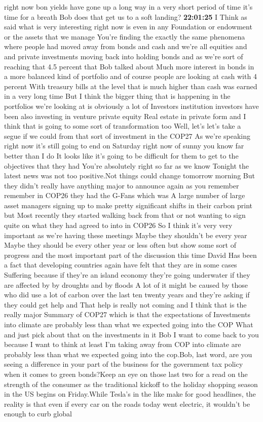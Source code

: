 \documentclass{article}%
\begin{document}
right now bon yields have gone up a long way in a very short period of time it's time for a breath Bob does that get us to a soft landing?%
\textbf{22:01:25}%
\newline%
I Think as said what is very interesting right now is even in any Foundation or endowment or the assets that we manage You're finding the exactly the same phenomena where people had moved away from bonds and cash and we're all equities and and private investments moving back into holding bonds and as we're sort of reaching that 4.5 percent that Bob talked about Much more interest in bonds in a more balanced kind of portfolio and of course people are looking at cash with 4 percent With treasury bills at the level that is much higher than cash was earned in a very long time But I think the bigger thing that is happening in the portfolios we're looking at is obviously a lot of Investors institution investors have been also investing in venture private equity Real estate in private form and I think that is going to some sort of transformation too Well, let's let's take a segue if we could from that sort of investment in the COP27 As we're speaking right now it's still going to end on Saturday right now of sunny you know far better than I do It looks like it's going to be difficult for them to get to the objectives that they had You're absolutely right so far as we know Tonight the latest news was not too positive.Not things could change tomorrow morning But they didn't really have anything major to announce again as you remember remember in COP26 they had the G{-}Fans which was A large number of large asset managers signing up to make pretty significant shifts in their carbon print but Most recently they started walking back from that or not wanting to sign quite on what they had agreed to into in COP26 So I think it's very very important as we're having these meetings Maybe they shouldn't be every year Maybe they should be every other year or less often but show some sort of progress and the most important part of the discussion this time David Has been a fact that developing countries again have felt that they are in some cases Suffering because if they're an island economy they're going underwater if they are affected by by droughts and by floods A lot of it might be caused by those who did use a lot of carbon over the last ten twenty years and they're asking if they could get help and That help is really not coming and I think that is the really major Summary of COP27 which is that the expectations of Investments into climate are probably less than what we expected going into the COP What and just pick about that on the investments in it Bob I want to come back to you because I want to think at least I'm taking away from COP  into climate are probably less than what we expected going into the cop.Bob, last word, are you seeing a difference in your part of the business for the government tax policy when it comes to green bonds?Keep an eye on those last two for a read on the strength of the consumer as the traditional kickoff to the holiday shopping season in the US begins on Friday.While Tesla's in the like make for good headlines, the reality is that even if every car on the roads today went electric, it wouldn't be enough to curb global 
\end{document}
